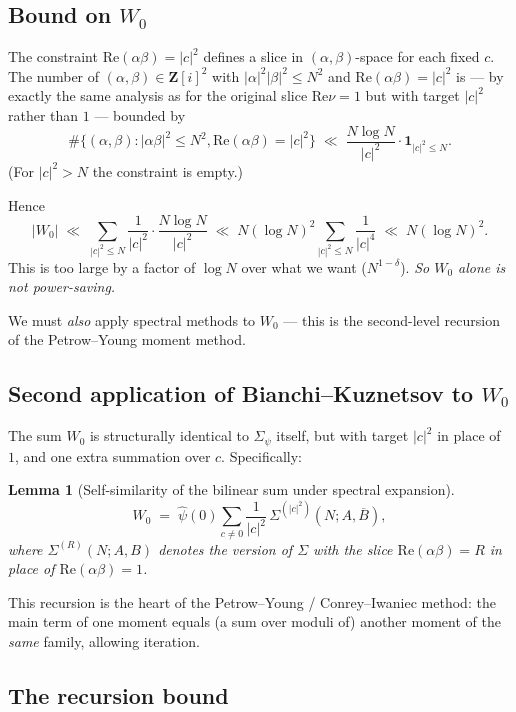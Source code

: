 \documentclass[11pt]{article}
\newtheorem{lemma}[theorem]{Lemma}
\theoremstyle{definition}
\newcommand{\Z}{\mathbf{Z}}
\newcommand{\Zi}{\Z[i]}
\renewcommand{\Re}{\mathrm{Re}}
\begin{document}
\subsection{Bound on $W_0$}

The constraint $\Re(\alpha\beta)=|c|^2$ defines a slice in $(\alpha,\beta)$-space for each fixed $c$. The number of $(\alpha,\beta)\in\Zi^2$ with $|\alpha|^2|\beta|^2\le N^2$ and $\Re(\alpha\beta)=|c|^2$ is — by exactly the same analysis as for the original slice $\Re\nu=1$ but with target $|c|^2$ rather than $1$ — bounded by
\[
\#\{(\alpha,\beta):|\alpha\beta|^2\le N^2,\Re(\alpha\beta)=|c|^2\}\;\ll\;\frac{N\log N}{|c|^2}\cdot\mathbf{1}_{|c|^2\le N}.
\]
(For $|c|^2>N$ the constraint is empty.)

Hence
\[
|W_0|\;\ll\;\sum_{|c|^2\le N}\frac{1}{|c|^2}\cdot\frac{N\log N}{|c|^2}\;\ll\;N(\log N)^2\sum_{|c|^2\le N}\frac{1}{|c|^4}\;\ll\;N(\log N)^2.
\]
This is too large by a factor of $\log N$ over what we want ($N^{1-\delta}$). \emph{So $W_0$ alone is not power-saving.}

We must \emph{also} apply spectral methods to $W_0$ — this is the second-level recursion of the Petrow--Young moment method.

\subsection{Second application of Bianchi--Kuznetsov to $W_0$}

The sum $W_0$ is structurally identical to $\Sigma_\psi$ itself, but with target $|c|^2$ in place of $1$, and one extra summation over $c$. Specifically:

\begin{lemma}[Self-similarity of the bilinear sum under spectral expansion]\label{lem:self-similar}
\[
W_0\;=\;\widehat\psi(0)\sum_{c\ne 0}\frac{1}{|c|^2}\,\Sigma^{(|c|^2)}(N;A,\overline B),
\]
where $\Sigma^{(R)}(N;A,B)$ denotes the version of $\Sigma$ with the slice $\Re(\alpha\beta)=R$ in place of $\Re(\alpha\beta)=1$.
\end{lemma}

This recursion is the heart of the Petrow--Young / Conrey--Iwaniec method: the main term of one moment equals (a sum over moduli of) another moment of the \emph{same} family, allowing iteration.

\subsection{The recursion bound}
\end{document}
